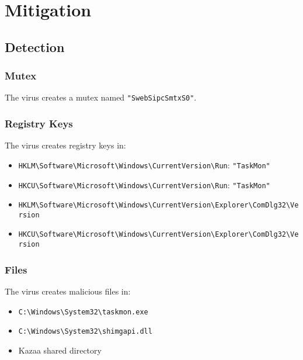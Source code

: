 \documentclass[11pt]{article}
\begin{document}
\section{Mitigation}
\label{sec:org8827a3a}
\subsection{Detection}
\label{sec:org7066a02}
\subsubsection{Mutex}
\label{sec:orga718157}
The virus creates a mutex named \texttt{"SwebSipcSmtxS0"}.
\subsubsection{Registry Keys}
\label{sec:orgd1fcdfa}
The virus creates registry keys in:

\begin{itemize}
\item \texttt{HKLM\textbackslash{}Software\textbackslash{}Microsoft\textbackslash{}Windows\textbackslash{}CurrentVersion\textbackslash{}Run}: \texttt{"TaskMon"}
\item \texttt{HKCU\textbackslash{}Software\textbackslash{}Microsoft\textbackslash{}Windows\textbackslash{}CurrentVersion\textbackslash{}Run}: \texttt{"TaskMon"}
\item \texttt{HKLM\textbackslash{}Software\textbackslash{}Microsoft\textbackslash{}Windows\textbackslash{}CurrentVersion\textbackslash{}Explorer\textbackslash{}ComDlg32\textbackslash{}Version}
\item \texttt{HKCU\textbackslash{}Software\textbackslash{}Microsoft\textbackslash{}Windows\textbackslash{}CurrentVersion\textbackslash{}Explorer\textbackslash{}ComDlg32\textbackslash{}Version}
\end{itemize}
\subsubsection{Files}
\label{sec:orga59110b}
The virus creates malicious files in:

\begin{itemize}
\item \texttt{C:\textbackslash{}Windows\textbackslash{}System32\textbackslash{}taskmon.exe}
\item \texttt{C:\textbackslash{}Windows\textbackslash{}System32\textbackslash{}shimgapi.dll}
\item Kazaa shared directory
\end{itemize}
\end{document}

